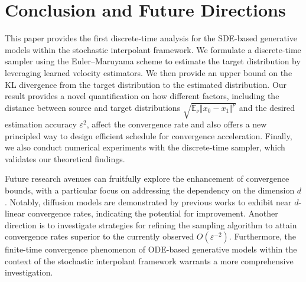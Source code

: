 \section{Conclusion and Future Directions}

This paper provides the first discrete-time analysis for the SDE-based generative models within the stochastic interpolant framework. We formulate a discrete-time sampler using the Euler–Maruyama scheme to estimate the target distribution by leveraging learned velocity estimators. We then provide an upper bound on the KL divergence from the target distribution to the estimated distribution. 
Our result provides a novel quantification on how different factors, including 
the distance between source and target distributions $\sqrt{\mathbb{E}_{\nu}\Vert x_0-x_1\Vert^p}$ and the desired estimation accuracy $\varepsilon^2$, affect the convergence rate and also offers a new principled way to design efficient schedule for convergence acceleration. 
Finally, we also conduct numerical experiments with the discrete-time sampler, which validates our theoretical findings. 

Future research avenues can fruitfully explore the enhancement of convergence bounds, with a particular focus on addressing the dependency on the dimension $d$. Notably, diffusion models are demonstrated by previous works to exhibit near $d$-linear convergence rates, indicating the potential for improvement. Another direction is to investigate strategies for refining the sampling algorithm to attain convergence rates superior to the currently observed $O(\varepsilon^{-2})$. Furthermore, the finite-time convergence phenomenon of ODE-based generative models within the context of the stochastic interpolant framework warrants a more comprehensive investigation.




